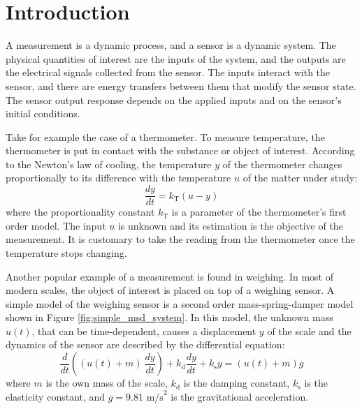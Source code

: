 \glsresetall

\chapter{Introduction} \label{chap:Introduction}


A measurement is a dynamic process, and a sensor is a dynamic system.
The physical quantities of interest are the inputs of the system, and the outputs are the electrical signals collected from the sensor.
The inputs interact with the sensor, and there are energy transfers between them that modify the sensor state.
The sensor output response depends on the applied inputs and on the sensor's initial conditions.

\color{blue}

Take for example the case of a thermometer.
To measure temperature, the thermometer is put in contact with the substance or object of interest.
According to the Newton's law of cooling, the temperature $y$ of the thermometer changes proportionally to its difference with the temperature $u$ of the matter under study:
\begin{equation}  \dfrac{dy}{dt} = k_{\mathrm{T}} \left( u - y \right) \label{eqn:NewtonCooling} \end{equation}
where the proportionality constant $k_{\mathrm{T}}$ is a parameter of the thermometer's first order model.
The input $u$ is unknown and its estimation is the objective of the measurement.
It is customary to take the reading from the thermometer once the temperature stops changing. 

Another popular example of a measurement is found in weighing. 
In most of modern scales, the object of interest is placed on top of a weighing sensor.
A simple model of the weighing sensor is a second order mass-spring-damper model shown in Figure \ref{fig:simple_msd_system}.
In this model, the unknown mass $u(t)$, that can be time-dependent, causes a displacement $y$ of the scale and the dynamics of the sensor are described by the differential equation:
\begin{equation} \dfrac{d}{dt} \left( \left(u(t)+m\right) \ \dfrac{dy}{dt} \right) + k_{\mathrm{d}} \dfrac{dy}{dt} + k_{\mathrm{s}} y = \left(u(t)+m\right)  g \end{equation}
where $m$ is the own mass of the scale, $k_{\mathrm{d}}$ is the damping constant, $k_{\mathrm{s}}$ is the elasticity constant, and $g = 9.81$ $\mathrm{m/s}^2$ is the gravitational acceleration. 

